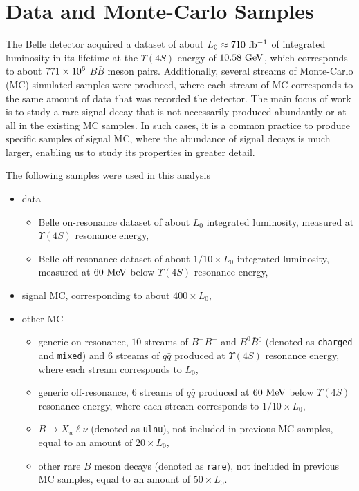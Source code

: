\chapter{Data and Monte-Carlo Samples}\label{sec:data-and-monte-carlo-samples}

The Belle detector acquired a dataset of about $L_0 \approx 710\mathrm{~fb^{-1}}$ of integrated luminosity in its lifetime at the $\Upsilon(4S)$ energy of $10.58\mathrm{~GeV}$, which corresponds to about $771\times 10^{6}$ $B \bar B$ meson pairs. Additionally, several streams of Monte-Carlo (MC) simulated samples were produced, where each stream of MC corresponds to the same amount of data that was recorded the detector. The main focus of work is to study a rare signal decay that is not necessarily produced abundantly or at all in the existing MC samples. In such cases, it is a common practice to produce specific samples of signal MC, where the abundance of signal decays is much larger, enabling us to study its properties in greater detail.

The following samples were used in this analysis
\begin{itemize}
	\item data
	\begin{itemize}
		\item Belle on-resonance dataset of about $L_0$ integrated luminosity, measured at $\Upsilon(4S)$ resonance energy,
		\item Belle off-resonance dataset of about $1/10 \times L_0$ integrated luminosity, measured at $60\mathrm{~MeV}$ below $\Upsilon(4S)$ resonance energy,
	\end{itemize}
	\item signal MC, corresponding to about $400 \times L_0$,
	\item other MC
	\begin{itemize}
		\item generic on-resonance, $10$ streams of $B^+B^-$ and $B^0\bar B{}^0$ (denoted as \texttt{charged} and \texttt{mixed}) and $6$ streams of $q\bar q$ produced at $\Upsilon(4S)$ resonance energy, where each stream corresponds to $L_0$,
		\item generic off-resonance, $6$ streams of $q\bar q$ produced at $60\mathrm{~MeV}$ below $\Upsilon(4S)$ resonance energy, where each stream corresponds to $1/10 \times L_0$,
		\item $B\to X_u \ell \nu$ (denoted as \texttt{ulnu}), not included in previous MC samples, equal to an amount of $20 \times L_0$, 
		\item other rare $B$ meson decays (denoted as \texttt{rare}), not included in previous MC samples, equal to an amount of $50 \times L_0$.
	\end{itemize}
\end{itemize}

